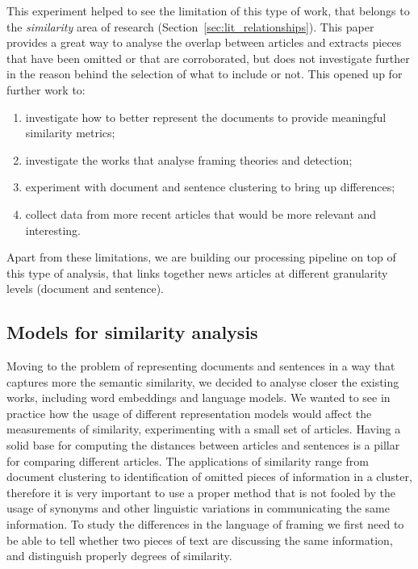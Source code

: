 

This experiment helped to see the limitation of this type of work, that belongs to the \emph{similarity} area of research (Section~\ref{sec:lit_relationships}).
This paper provides a great way to analyse the overlap between articles and extracts pieces that have been omitted or that are corroborated, but does not investigate further in the reason behind the selection of what to include or not.
This opened up for further work to:
\begin{enumerate}
    \item investigate how to better represent the documents to provide meaningful similarity metrics;
    \item investigate the works that analyse framing theories and detection;
    \item experiment with document and sentence clustering to bring up differences;
    \item collect data from more recent articles that would be more relevant and interesting.
\end{enumerate}

Apart from these limitations, we are building our processing pipeline on top of this type of analysis, that links together news articles at different granularity levels (document and sentence).


\subsection{Models for similarity analysis}
Moving to the problem of representing documents and sentences in a way that captures more the semantic similarity, we decided to analyse closer the existing works, including word embeddings and language models.
We wanted to see in practice how the usage of different representation models would affect the measurements of similarity, experimenting with a small set of articles. 
Having a solid base for computing the distances between articles and sentences is a pillar for comparing different articles. The applications of similarity range from document clustering to identification of omitted pieces of information in a cluster, therefore it is very important to use a proper method that is not fooled by the usage of synonyms and other linguistic variations in communicating the same information. To study the differences in the language of framing we first need to be able to tell whether two pieces of text are discussing the same information, and distinguish properly degrees of similarity.

